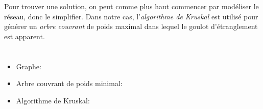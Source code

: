{{Pour trouver une solution, on peut comme plus haut commencer par modéliser le réseau, donc le simplifier. Dans notre cas, l’\emph{algorithme de Kruskal} est utilisé pour générer un \emph{arbre couvrant} de poids maximal dans lequel le goulot d’étranglement est apparent.



\section*{\BrochureWebsitesAndKeywords}
{\raggedright
\begin{itemize}
  \item Graphe: \href{https://fr.wikipedia.org/wiki/Graphe_(math\%C3\%A9matiques_discr\%C3\%A8tes)}{}
  \item Arbre couvrant de poids minimal: \href{https://fr.wikipedia.org/wiki/Arbre_couvrant}{}
  \item Algorithme de Kruskal: \href{https://fr.wikipedia.org/wiki/Algorithme_de_Kruskal}{}
\end{itemize}


}

}{}

\def\AuthorBolonkinM{} %
\def\AuthorSitdikovT{} %
\def\AuthorHironM{} %
\def\AuthorBrodnikA{} %
\def\AuthorGallenbacherJ{} %
\def\AuthorDatzkoS{} %
\def\AuthorPelletE{} %

\newpage}{}
